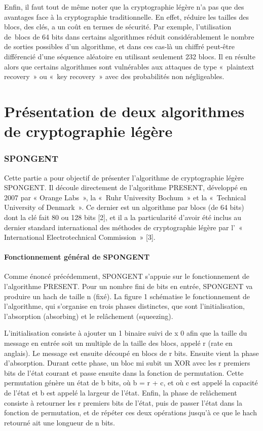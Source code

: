 				Enfin, il faut tout de même noter que la cryptographie légère n’a pas
			que des avantages face à la cryptographie traditionnelle. En effet,
			réduire les tailles des blocs, des clés, a un coût en termes de sécurité.
			Par exemple, l’utilisation de blocs de 64 bits dans certains algorithmes
			réduit considérablement le nombre de sorties possibles d’un algorithme,
			et dans ces cas-là un chiffré peut-être différencié d’une séquence
			aléatoire en utilisant seulement 232 blocs. Il en résulte alors que
			certains algorithmes sont vulnérables aux attaques de type « plaintext
			recovery » ou « key recovery » avec des probabilités non négligeables.

\part{Présentation de deux algorithmes de cryptographie légère}

	\section{SPONGENT}

			Cette partie a pour objectif de présenter l’algorithme de cryptographie légère
		SPONGENT. Il découle directement de l’algorithme PRESENT, développé en 2007 par «
		Orange Labs », la « Ruhr University Bochum » et la « Technical  University of
		Denmark ». Ce dernier est un algorithme par blocs (de 64 bits) dont la clé fait
		80 ou 128 bits [2], et il a la particularité d’avoir été inclus au dernier
		standard international des méthodes de cryptographie légère par l’ «
		International Electrotechnical Commission » [3].

		\subsection{Fonctionnement général de SPONGENT}

			Comme énoncé précédemment, SPONGENT s’appuie sur le fonctionnement de
		l’algorithme PRESENT. Pour un nombre fini de bits en entrée, SPONGENT va
		produire un hach de taille n (fixé). La figure 1 schématise le
		fonctionnement de l’algorithme, qui s’organise en trois phases distinctes,
		que sont l’initialisation, l’absorption (absorbing) et le relâchement
		(squeezing).

			L’initialisation consiste à ajouter un 1 binaire suivi de x 0 afin que la
		taille du message en entrée soit un multiple de la taille des blocs, appelé r
		(rate en anglais). Le message est ensuite découpé en blocs de r bits. Ensuite
		vient la phase d’absorption. Durant cette phase, un bloc mi subit un XOR avec
		les r premiers bits de l’état courant et passe ensuite dans la fonction de
		permutation. Cette permutation génère un état de b bits, où b = r + c, et où c
		est appelé la capacité de l’état et b est appelé la largeur de l’état. Enfin,
		la phase de relâchement consiste à retourner les r premiers bits de l’état,
		puis de passer l’état dans la fonction de permutation, et de répéter ces deux
		opérations jusqu’à ce que le hach retourné ait une longueur de n bits.


